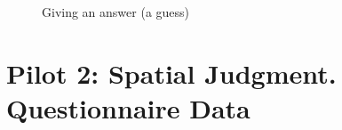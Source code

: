 \begin{appendices}
\begin{figure}
	\par
	\par
	
	\caption{Giving an answer (a guess)}
	\label{fig:pilot2tutorialgivinganswer}
\end{figure}


\chapter{Pilot 2: Spatial Judgment. Questionnaire Data}
\label{app:pilot2questionnaire_data}



\end{appendices}
